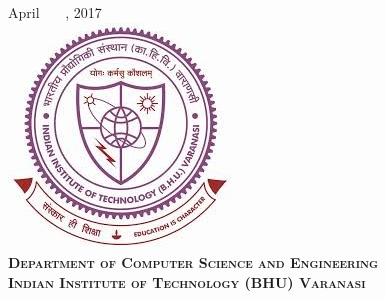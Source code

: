 \documentclass[a4paper]{report}
\begin{document}
\begin{titlepage}

{\large April \ \ \ , 2017}\\[1cm] %


\includegraphics{pictures/collegeLogo.png}\\[1.0cm]

\textsc{\Large \bfseries Department of Computer Science and Engineering}\\[0.5cm] %
\textsc{\Large \bfseries Indian Institute of Technology (BHU) Varanasi}\\[0.5cm] %






\vfill %

\end{titlepage}

\newpage\null\thispagestyle{empty}\newpage

\end{document}
